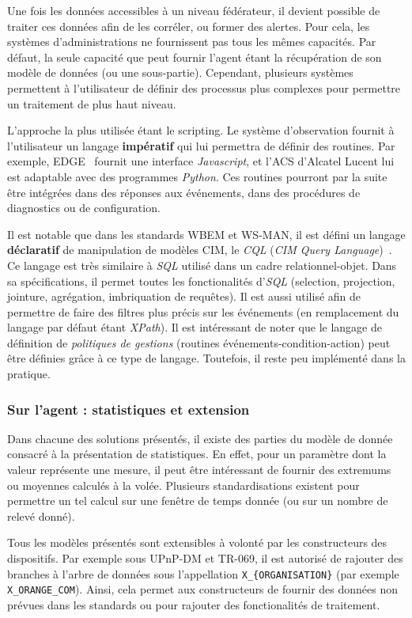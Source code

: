 Une fois les données accessibles à un niveau fédérateur, il devient possible de traiter ces données afin de les corréler, ou former des alertes. Pour cela, les systèmes d'administrations ne fournissent pas tous les mêmes capacités. Par défaut, la seule capacité que peut fournir l'agent étant la récupération de son modèle de données (ou une sous-partie). Cependant, plusieurs systèmes permettent à l'utilisateur de définir des processus plus complexes pour permettre un traitement de plus haut niveau.

L'approche la plus utilisée étant le scripting. Le système d'observation fournit à l'utilisateur un langage \textbf{impératif} qui lui permettra de définir des routines. Par exemple, EDGE~\cite{Motorola:EDGE} fournit une interface \textit{Javascript}, et l'ACS d'Alcatel Lucent lui est adaptable avec des programmes \textit{Python}. Ces routines pourront par la suite être intégrées dans des réponses aux événements, dans des procédures de diagnostics ou de configuration.

Il est notable que dans les standards WBEM et WS-MAN, il est défini un langage \textbf{déclaratif} de manipulation de modèles CIM, le \textit{CQL} (\textit{CIM Query Language})~\cite{DMTF:CIM-QL}. Ce langage est très similaire à \textit{SQL} utilisé dans un cadre relationnel-objet. Dans sa spécifications, il permet toutes les fonctionalités d'\textit{SQL} (selection, projection, jointure, agrégation, imbriquation de requêtes). Il est aussi utilisé afin de permettre de faire des filtres plus précis sur les événements (en remplacement du langage par défaut étant \textit{XPath}). Il est intéressant de noter que le langage de définition de \textit{politiques de gestions} (routines événements-condition-action) peut être définies grâce à ce type de langage. Toutefois, il reste peu implémenté dans la pratique.

\subsubsection{Sur l'agent : statistiques et extension}
Dans chacune des solutions présentés, il existe des parties du modèle de donnée consacré à la présentation de statistiques. En effet, pour un paramètre dont la valeur représente une mesure, il peut être intéressant de fournir des extremums ou moyennes calculés à la volée. Plusieurs standardisations existent pour permettre un tel calcul sur une fenêtre de temps donnée (ou sur un nombre de relevé donné).

Tous les modèles présentés sont extensibles à volonté par les constructeurs des dispositifs. Par exemple sous UPnP-DM et TR-069, il est autorisé de rajouter des branches à l'arbre de données sous l'appellation \verb|X_{ORGANISATION}| (par exemple \verb|X_ORANGE_COM|). Ainsi, cela permet aux constructeurs de fournir des données non prévues dans les standards ou pour rajouter des fonctionalités de traitement.

